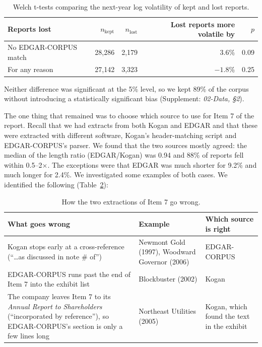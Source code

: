 \documentclass[11pt,a4paper]{article}
\newcommand{\supp}[1]{(Supplement: \textit{#1})}
\begin{document}
\begin{table}[ht]
  \centering
  \small
  \caption{Welch t-tests comparing the next-year log volatility of kept and lost reports.}\label{tab:welch}
  \begin{tabular}{@{}lrrrr@{}}
    \toprule
    Reports lost & $n_{\text{kept}}$ & $n_{\text{lost}}$ & Lost reports more volatile by & $p$ \\
    \midrule
    No EDGAR-CORPUS match & 28,286 & 2,179 & 3.6\% & 0.09 \\
    For any reason & 27,142 & 3,323 & $-1.8$\% & 0.25 \\
    \bottomrule
  \end{tabular}
\end{table}

Neither difference was significant at the 5\% level, so we kept 89\% of the corpus without introducing a statistically significant bias \supp{02-Data, \S2}.

The one thing that remained was to choose which source to use for Item 7 of the report. Recall that we had extracts from both Kogan and EDGAR and that these were extracted with different software, Kogan's header-matching script and EDGAR-CORPUS's parser. We found that the two sources mostly agreed: the median of the length ratio (EDGAR/Kogan) was 0.94 and 88\% of reports fell within 0.5--2$\times$. The exceptions were that EDGAR was much shorter for 9.2\% and much longer for 2.4\%. We investigated some examples of both cases. We identified the following (Table~\ref{tab:item7}):

\begin{table}[ht]
  \centering
  \small
  \caption{How the two extractions of Item 7 go wrong.}\label{tab:item7}
  \begin{tabular}{@{}p{7.0cm}p{4.6cm}p{4.4cm}@{}}
    \toprule
    What goes wrong & Example & Which source is right \\
    \midrule
    Kogan stops early at a cross-reference (``\ldots as discussed in note \# of'') & Newmont Gold (1997), Woodward Governor (2006) & EDGAR-CORPUS \\
    EDGAR-CORPUS runs past the end of Item 7 into the exhibit list & Blockbuster (2002) & Kogan \\
    The company leaves Item 7 to its \textit{Annual Report to Shareholders} (``incorporated by reference''), so EDGAR-CORPUS's section is only a few lines long & Northeast Utilities (2005) & Kogan, which found the text in the exhibit \\
    \bottomrule
  \end{tabular}
\end{table}
\end{document}
